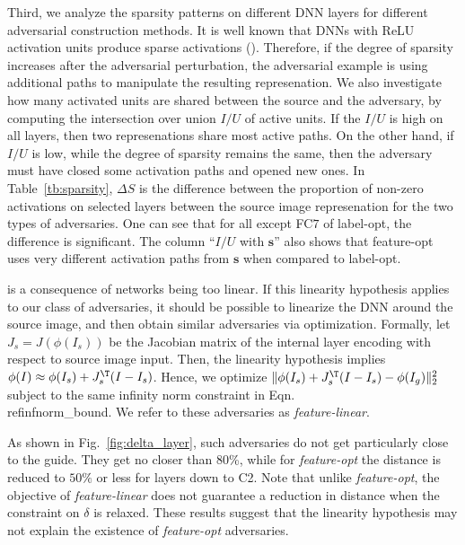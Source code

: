 \documentclass[10pt,twocolumn,letterpaper]{article}
\newcommand{\source}{{\boldsymbol{\mathbf{s}}}}\newcommand{\guide}{\boldsymbol{\mathbf{g}}}\newcommand{\adv}{\boldsymbol{\mathbf{\alpha}}}\newcommand{\neigh}[2]{\ensuremath{n_{#1} ({#2})}}\newcommand{\Neighs}[2]{\ensuremath{\mathcal{N}}_{{#1}} ({#2})}\newcommand{\NNavg}[2]{\ensuremath{a_{#1} ({#2})}}\newcommand{\NNz}[2]{\ensuremath{z_{#1} ({#2})}}\newcommand{\class}[1]{C ({#1})}\newcommand{\dist}[2]{\ensuremath{D ({#1}, {#2})}}\newcommand{\rank}[2]{\ensuremath{r_{#1} ({#2})}}\newcommand{\rankdiff}[1]{\ensuremath{\Delta{r_{#1}}}}\newcommand{\dlike}[2]{\ensuremath{\Delta L({#1}, {#2})}}%
\begin{document}
Third, we analyze the sparsity  patterns on different DNN layers for 
different adversarial construction methods. It is well known that DNNs 
with ReLU activation units produce sparse activations 
(\cite{AISTATS2011_GlorotBB11}).  Therefore, if the degree of sparsity 
increases after the adversarial perturbation, the adversarial example 
is using additional paths to manipulate the resulting represenation. 
We also investigate how many activated units are shared between the source 
and the adversary, by computing the intersection over union {\em $I/U$} of 
active units. If the $I/U$ is high on all layers, then two represenations 
share most active paths. On the other hand, if $I/U$ is low, 
while the degree of sparsity remains the same, then the adversary must have 
closed some activation paths and opened new ones. In Table~\ref{tb:sparsity}, 
$\Delta S$ is the difference between the proportion of non-zero activations on 
selected layers between the source image represenation for the two types 
of adversaries. One can see that for all except FC$7$ of label-opt, the 
difference is significant. The column ``$I/U$ with $\source$'' also shows that 
feature-opt uses very different activation paths from $\source$ when compared 
to label-opt. 

is a consequence of networks being too linear.  If this linearity hypothesis 
applies to our class of adversaries, it should be possible to linearize the 
DNN around the source image, and then obtain similar adversaries via 
optimization. Formally, let $J_s = J(\phi(I_s))$ be the Jacobian matrix 
of the internal layer encoding with respect to source image input.  
Then, the 
linearity hypothesis implies $\phi(I) \approx \phi(I_s) + J_s^{\T}(I-I_s)$.
Hence, we optimize $\| \phi(I_s) + J_s^{\T}(I-I_s) - \phi(I_g)\|^2_2$ 
subject to the same infinity norm constraint in Eqn.\\ref{infnorm_bound}.
We refer to these adversaries as {\em feature-linear}.  

As shown in Fig.~\ref{fig:delta_layer}, such adversaries do not get 
particularly close to the guide.  They get no closer than 80\%, while
for {\em feature-opt} the distance is reduced to $50\%$ or less 
for layers down to C2.  Note that unlike {\em feature-opt}, the objective 
of {\em feature-linear} does not guarantee a reduction in distance 
when the constraint on $\delta$ is relaxed.  These results suggest that 
the linearity hypothesis may not explain the existence of {\em feature-opt} 
adversaries.  
\end{document}
